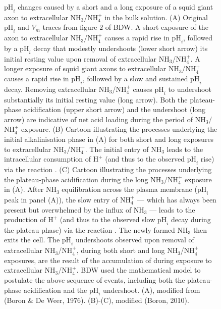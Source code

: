 \documentclass[fleqn,10pt]{physiome}
\begin{document}
\begin{figure}
\caption{\label{fig:2} $\mathrm{pH}_i$ changes caused by a short and a long exposure of a squid giant axon to extracellular $\mathrm{NH_3}$/$\mathrm{NH_4^+}$ in the bulk solution. (A) Original $\mathrm{pH}_i$ and $V_m$ traces from figure $2$ of BDW. A short exposure of the axon to extracellular $\mathrm{NH_3}$/$\mathrm{NH_4^+}$ causes a rapid rise in $\mathrm{pH}_i$, followed by a $\mathrm{pH}_i$ decay that modestly undershoots (lower short arrow) its initial resting value upon removal of extracellular $\mathrm{NH_3}$/$\mathrm{NH_4^+}$. A longer exposure of squid giant axons to extracellular $\mathrm{NH_3}$/$\mathrm{NH_4^+}$ causes a rapid rise in $\mathrm{pH}_i$, followed by a slow and sustained $\mathrm{pH}_i$ decay. Removing extracellular $\mathrm{NH_3}$/$\mathrm{NH_4^+}$ causes $\mathrm{pH}_i$ to undershoot substantially its initial resting value (long arrow). Both the plateau-phase acidification (upper short arrow) and the undershoot (long arrow) are indicative of net acid loading during the period of $\mathrm{NH_3}$/$\mathrm{NH_4^+}$ exposure. (B) Cartoon illustrating the processes underlying the initial alkalinisation phase in (A) for both short and long exposures to extracellular $\mathrm{NH_3}$/$\mathrm{NH_4^+}$. The initial entry of $\mathrm{NH_3}$ leads to the intracellular consumption of $\mathrm{H^+}$ (and thus to the observed $\mathrm{pH}_i$ rise) via the reaction . (C) Cartoon illustrating the processes underlying the plateau-phase acidification during the long $\mathrm{NH_3}$/$\mathrm{NH_4^+}$ exposure in (A). After $\mathrm{NH_3}$ equilibration across the plasma membrane ($\mathrm{pH}_i$ peak in panel (A)), the slow entry of $\mathrm{NH_4^+}$ --- which has always been present but overwhelmed by the influx of $\mathrm{NH_3}$ --- leads to the production of $\mathrm{H^+}$ (and thus to the observed slow $\mathrm{pH}_i$ decay during the plateau phase) via the reaction . The newly formed $\mathrm{NH_3}$ then exits the cell. The $\mathrm{pH}_i$ undershoots observed upon removal of extracellular $\mathrm{NH_3}$/$\mathrm{NH_4^+}$, during both short and long $\mathrm{NH_3}$/$\mathrm{NH_4^+}$ exposures, are the result of the accumulation of  during exposure to extracellular $\mathrm{NH_3}$/$\mathrm{NH_4^+}$. BDW used the mathematical model to postulate the above sequence of events, including both the plateau-phase acidification and the $\mathrm{pH}_i$ undershoot. (A), modified from (Boron \& De Weer, 1976). (B)-(C), modified (Boron, 2010).}
\end{figure}
\end{document}
